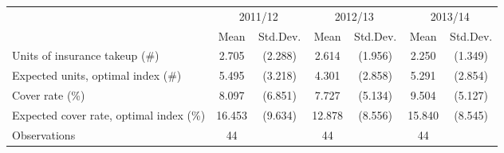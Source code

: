 {
\def\sym#1{\ifmmode^{#1}\else\(^{#1}\)\fi}
\begin{tabular}{l*{3}{cc}}
\hline\hline
                    &\multicolumn{2}{c}{2011/12}&\multicolumn{2}{c}{2012/13}&\multicolumn{2}{c}{2013/14}\\\cmidrule(lr){2-3}\cmidrule(lr){4-5}\cmidrule(lr){6-7}
                    &        Mean&    Std.Dev.&        Mean&    Std.Dev.&        Mean&    Std.Dev.\\
\hline
Units of insurance takeup (\#)&       2.705&     (2.288)&       2.614&     (1.956)&       2.250&     (1.349)\\
Expected units, optimal index (\#)&       5.495&     (3.218)&       4.301&     (2.858)&       5.291&     (2.854)\\
Cover rate (\%)     &       8.097&     (6.851)&       7.727&     (5.134)&       9.504&     (5.127)\\
Expected cover rate, optimal index (\%)&      16.453&     (9.634)&      12.878&     (8.556)&      15.840&     (8.545)\\
\hline
Observations        &          44&            &          44&            &          44&            \\
\hline\hline
\end{tabular}
}

